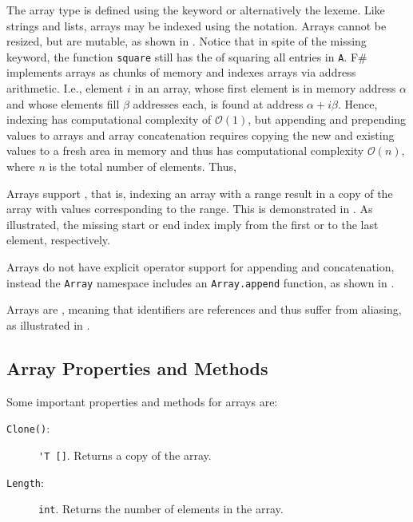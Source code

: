 The array type is defined using the  keyword or alternatively the \lexeme{[]} lexeme.  Like strings and lists, arrays may be indexed using the  notation. Arrays cannot be resized, but are mutable, as shown in .
%
%
Notice that in spite of the missing  keyword, the function \lstinline{square} still has the  of squaring all entries in \lstinline{A}.  F\# implements arrays as chunks of memory and indexes arrays via address arithmetic. I.e., element $i$ in an array, whose first element is in memory address $\alpha$ and whose elements fill $\beta$ addresses each, is found at address $\alpha+i\beta$. Hence, indexing has computational complexity of $\mathcal{O}(1)$, but appending and prepending values to arrays and array concatenation requires copying the new and existing values to a fresh area in memory and thus has computational complexity $\mathcal{O}(n)$, where $n$ is the total number of elements. Thus, 

Arrays support , that is, indexing an array with a range result in a copy of the array with values corresponding to the range. This is demonstrated in .
%
%
As illustrated, the missing start or end index imply from the first or to the last element, respectively.

Arrays do not have explicit operator support for appending and concatenation, instead the \lstinline{Array} namespace includes an \lstinline{Array.append} function, as shown in .
%
%

Arrays are , meaning that identifiers are references and thus suffer from aliasing, as illustrated in .
%
%

\subsection{Array Properties and Methods}
\label{sec:arrayMethods}
Some important properties and methods for arrays are:
\begin{description}
\item[\texttt{Clone()}:] \lstinline{'T []}. Returns a copy of the array.
\item[\texttt{Length}:] \lstinline{int}. Returns the number of elements in the array.
\end{description}

